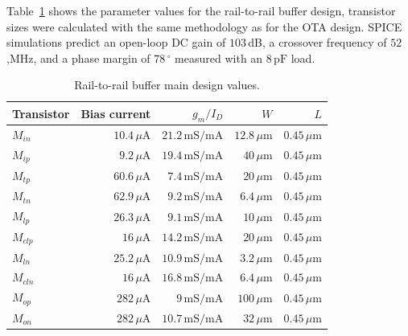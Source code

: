 Table~\ref{tab:buffer_sizes} shows the parameter values for the rail-to-rail buffer design, transistor sizes were calculated with the same methodology as for the OTA design. SPICE simulations predict an open-loop DC gain of $103$\,dB, a crossover frequency of $52$,MHz, and a phase margin of $78\,^\circ$ measured with an $8\,\text{pF}$ load. 
\begin{table}[!t]
	\begin{center}
		\begin{tabular}{|l|r|r|r|r|}\hline
			Transistor & Bias current & $g_m/I_D$ & $W$ & $L$ \\ \hline\hline
			$M_\textit{in}$ & $10.4\,\mu\text{A}$ & $21.2\,\text{mS}/\text{mA}$ & $12.8\,\mu\text{m}$ & $0.45\,\mu\text{m}$ \\ \hline
			$M_\textit{ip}$ & $9.2\,\mu\text{A}$ & $19.4\,\text{mS}/\text{mA}$ & $40\,\mu\text{m}$ & $0.45\,\mu\text{m}$ \\ \hline
			$M_\textit{tp}$ & $60.6\,\mu\text{A}$ & $7.4\,\text{mS}/\text{mA}$ & $20\,\mu\text{m}$ & $0.45\,\mu\text{m}$ \\ \hline
			$M_\textit{tn}$ & $62.9\,\mu\text{A}$ & $9.2\,\text{mS}/\text{mA}$ & $6.4\,\mu\text{m}$ & $0.45\,\mu\text{m}$ \\ \hline
			$M_\textit{lp}$ & $26.3\,\mu\text{A}$ & $9.1\,\text{mS}/\text{mA}$ & $10\,\mu\text{m}$ & $0.45\,\mu\text{m}$ \\ \hline
			$M_\textit{clp}$ & $16\,\mu\text{A}$ & $14.2\,\text{mS}/\text{mA}$ & $20\,\mu\text{m}$ & $0.45\,\mu\text{m}$ \\ \hline
			$M_\textit{ln}$ & $25.2\,\mu\text{A}$ & $10.9\,\text{mS}/\text{mA}$ & $3.2\,\mu\text{m}$ & $0.45\,\mu\text{m}$ \\ \hline
			$M_\textit{cln}$ & $16\,\mu\text{A}$ & $16.8\,\text{mS}/\text{mA}$ & $6.4\,\mu\text{m}$ & $0.45\,\mu\text{m}$ \\ \hline
			$M_\textit{op}$ & $282\,\mu\text{A}$ & $9\,\text{mS}/\text{mA}$ & $100\,\mu\text{m}$ & $0.45\,\mu\text{m}$ \\ \hline
			$M_\textit{on}$ & $282\,\mu\text{A}$ & $10.7\,\text{mS}/\text{mA}$ & $32\,\mu\text{m}$ & $0.45\,\mu\text{m}$ \\\hline
		\end{tabular}
		\vspace*{5pt}
		\caption{Rail-to-rail buffer main design values.}
		\label{tab:buffer_sizes}
	\end{center}
\end{table}
